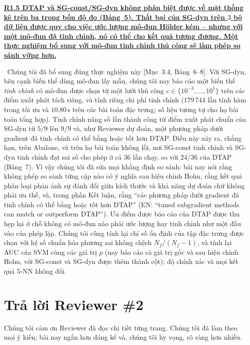 \documentclass[11pt]{article}
\newcommand{\response}[1]{\smallskip\noindent{\color{blue!60!black}\textbf{Trả lời.}}\ #1\par\medskip}
\newcommand{\loc}[1]{\textcolor{blue!50!black}{[#1]}}
\newcommand{\en}[1]{{\color{gray}\small(EN: ``#1'')}}
\newenvironment{point}[1]{\medskip\noindent\textbf{\uline{#1}}\par}{\par}
\begin{document}
\begin{point}{R1.5 DTAP và SG-const/SG-dyn không phân biệt được về mặt thống kê trên ba
trong bốn độ đo (Bảng~5). Thất bại của SG-dyn trên $3$ bộ dữ liệu được quy cho việc ước lượng
mô-đun H\"older kém -- nhưng với một mô-đun đã tinh chỉnh, nó có thể cho kết quả tương đương. Một
thực nghiệm bổ sung với mô-đun tinh chỉnh thủ công sẽ làm phép so sánh vững hơn.}
\response{Chúng tôi đã bổ sung đúng thực nghiệm này \loc{Mục~3.4, Bảng~6--8}. Với SG-dyn, bên cạnh
biến thể dùng mô-đun lấy mẫu, chúng tôi nay báo cáo một biến thể \emph{tinh chỉnh} có mô-đun được
chọn từ một lưới thủ công $c\in\{10^{-3},\dots,10^{1}\}$ trên các điểm xuất phát tách riêng, và
tính riêng chi phí tinh chỉnh ($179\,744$ lần tính hàm trong tối ưu và
$10.80$\,s trên các bài toán đặc trưng; số liệu tương tự cho họ bài toán tổng hợp). Tinh chỉnh
nâng số lần thành công từ điểm xuất phát chuẩn của SG-dyn từ $5/9$ lên $9/9$ và, như Reviewer
dự đoán, một phương pháp dưới gradient đã tinh chỉnh có thể bằng hoặc tốt hơn DTAP. Điều này xảy ra, chẳng hạn, trên Abalone, và trên họ bài toán không lồi, nơi SG-const tinh chỉnh và SG-dyn tinh chỉnh đạt sai số cho phép ở cả $36$ lần chạy, so với $24/36$ của DTAP (Bảng~7). Vì vậy chúng tôi đã sửa mọi khẳng định
so sánh: bài nay nói rằng không phép so sánh từng cặp nào có ý nghĩa sau hiệu chỉnh
Holm, rằng kết quả phân loại phản ánh sự đánh đổi giữa kích thước và khả năng dự đoán chứ không phải
ưu thế, và, trong phần Kết luận, rằng ``các phương pháp dưới gradient đã tinh chỉnh có thể bằng hoặc tốt hơn
DTAP'' \en{tuned subgradient methods can match or outperform
DTAP}. Ưu điểm được báo cáo của DTAP được thu hẹp lại ở chỗ không có mô-đun nào phải ước lượng hay
tinh chỉnh như một đầu vào của phép lặp. Chúng tôi cũng tính lại chỉ số ổn định của tập đặc trưng được chọn với hệ số chuẩn hóa phương sai không chệch $N_f/(N_f-1)$, và tính lại AUC của SVM cùng các giá trị $p$ (nay báo cáo cả giá trị gốc và sau hiệu chỉnh Holm, với SG-const và SG-dyn được thêm thành cột); độ chính xác và mọi kết quả $5$-NN không đổi.}
\end{point}

\section*{Trả lời Reviewer \#2}

\noindent Chúng tôi cảm ơn Reviewer đã đọc chi tiết từng trang. Chúng tôi đã làm theo
mọi ý kiến; bài nay ngắn hơn đáng kể và, chúng tôi hy vọng, rõ ràng hơn nhiều.
\end{document}
